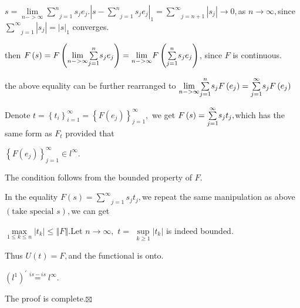 \documentclass{article}
\begin{document}
$s=\underset{n->\infty }{\lim }\underset{j=1}{\overset{n}{\sum }}%
s_{j}e_{j}.\left\vert s-\underset{j=1}{\overset{n}{\sum }}%
s_{j}e_{j}\right\vert _{1}=\underset{j=n+1}{\overset{\infty }{\sum }}%
\left\vert s_{j}\right\vert \rightarrow 0,$as $n\rightarrow \infty ,$since $%
\underset{j=1}{\overset{\infty }{\sum }}\left\vert s_{j}\right\vert
=\left\vert s\right\vert _{1}$ converges.

then $F\left( s\right) =F\left( \underset{n->\infty }{\lim }\underset{j=1}{%
\overset{n}{\sum }}s_{j}e_{j}\right) =\underset{n->\infty }{\lim }F\left( 
\underset{j=1}{\overset{n}{\sum }}s_{j}e_{j}\right) $, since $F$ is
continuous.

the above equality can be further rearranged to $\underset{n->\infty }{\lim }%
\underset{j=1}{\overset{n}{\sum }}s_{j}F\left( e_{j}\right) =\underset{j=1}{%
\overset{\infty }{\sum }}s_{j}F\left( e_{j}\right) $

Denote $t=\left\{ t_{i}\right\} _{i=1}^{\infty }=\left\{ F\left(
e_{j}\right) \right\} _{j=1}^{\infty },$ we get $F\left( s\right) =\underset{%
j=1}{\overset{\infty }{\sum }}s_{j}t_{j},$which has the same form as $F_{t}$
provided that

$\left\{ F\left( e_{j}\right) \right\} _{j=1}^{\infty }\in l^{\infty }.$

The condition follows from the bounded property of $F.$

In the equality $F\left( s\right) =\underset{j=1}{\overset{\infty }{\sum }}%
s_{j}t_{j},$we repeat the same manipulation as above$\left( \text{take
special }s\right) ,$we can get

$\underset{1\leq k\leq n}{\max }\left\vert t_{k}\right\vert \leq \left\Vert
F\right\Vert .$Let $n\rightarrow \infty ,$ $t=$ $\underset{k\geq 1}{\sup }%
\left\vert t_{k}\right\vert $ is indeed bounded.

Thus $U\left( t\right) =F,$and the functional is onto.

$\left( l^{1}\right) ^{\prime }\overset{is-is}{=}l^{\infty }.$

The proof is complete.$\boxtimes $
\end{document}
